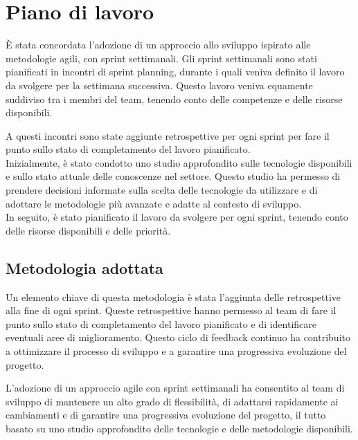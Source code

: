 

\section{Piano di lavoro}
È stata concordata l'adozione di un approccio allo sviluppo ispirato alle
metodologie agili, con sprint settimanali. Gli sprint settimanali sono stati pianificati in incontri di sprint planning, durante i quali veniva definito il lavoro da svolgere per la settimana successiva. Questo lavoro veniva equamente suddiviso tra i membri del team, tenendo conto delle competenze e delle risorse disponibili.


A questi incontri sono state aggiunte retrospettive
per ogni sprint per fare il punto sullo stato di completamento del lavoro pianificato.\\

Inizialmente, è stato condotto uno studio approfondito sulle tecnologie disponibili e sullo stato attuale delle conoscenze nel settore. Questo studio ha permesso di prendere decisioni informate sulla scelta delle tecnologie da utilizzare e di adottare le metodologie più avanzate e adatte al contesto di sviluppo.\\

In seguito, è stato pianificato il lavoro da svolgere per ogni sprint, tenendo conto
delle risorse disponibili e delle priorità.\\


\subsection{Metodologia adottata}
Un elemento chiave di questa metodologia è stata l'aggiunta delle retrospettive alla fine di ogni sprint. Queste retrospettive hanno permesso al team di fare il punto sullo stato di completamento del lavoro pianificato e di identificare eventuali aree di miglioramento. Questo ciclo di feedback continuo ha contribuito a ottimizzare il processo di sviluppo e a garantire una progressiva evoluzione del progetto.

L'adozione di un approccio agile con sprint settimanali ha consentito al team di sviluppo di mantenere un alto grado di flessibilità, di adattarsi rapidamente ai cambiamenti e di garantire una progressiva evoluzione del progetto, il tutto basato su uno studio approfondito delle tecnologie e delle metodologie disponibili.

